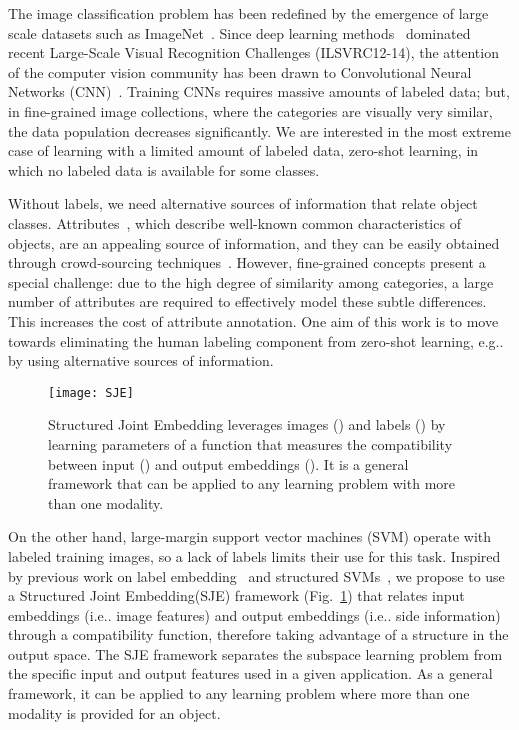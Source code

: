 \documentclass[10pt,twocolumn,letterpaper]{article}
\makeatletter
\newcommand{\cutcaptiondown}{\vspace*{-0.12in}}
\newcommand{\SJElong}{Structured Joint Embedding\xspace}
\newcommand{\SJE}{SJE\xspace}
\DeclareRobustCommand\onedot{\futurelet\@let@token\@onedot}
\def\@onedot{\ifx\@let@token.\else.\null\fi\xspace}
\def\eg{{e.g}\onedot} \def\Eg{{E.g}\onedot}
\def\ie{{i.e}\onedot} \def\Ie{{I.e}\onedot}
\makeatother
\begin{document}
The image classification problem has been redefined by the emergence of large scale datasets such as ImageNet~\cite{DDS09}. 
Since deep learning methods~\cite{KSH12} dominated recent Large-Scale Visual Recognition Challenges (ILSVRC12-14), the attention of the computer vision community has been drawn to Convolutional Neural Networks (CNN)~\cite{LBBH98}.
Training CNNs requires massive amounts of labeled data; but, in fine-grained image collections, where the categories are visually very similar, the data population decreases significantly.
We are interested in the most extreme case of learning with a limited amount of labeled data, zero-shot learning, in which no labeled data is available for some classes.



Without labels, we need alternative sources of information that relate object classes. 
Attributes~\cite{FZ07, FEHF09, LNH13}, which describe well-known common characteristics of objects, are an appealing source of information, and they can be easily obtained through crowd-sourcing techniques~\cite{DKF13, PG11}. However, fine-grained concepts present a special challenge: due to the high degree of similarity among categories, a large number of attributes are required to effectively model these subtle differences.
This increases the cost of attribute annotation. 
One aim of this work is to move towards 
eliminating the human labeling component from zero-shot learning, \eg by using alternative sources of information. 
\begin{figure}[t]
\begin{center}
\texttt{[image: SJE]}
\end{center}
\caption{\SJElong leverages images () and labels () by learning parameters  of a function  that measures the compatibility between input () and output embeddings (). It is a general framework that can be applied to any learning problem with more than one modality.} \vspace{-2mm}
\label{fig:methodology}
\cutcaptiondown
\end{figure}

On the other hand, large-margin support vector machines (SVM) operate with labeled training images, so a lack of labels limits their use for this task.
Inspired by previous work on label embedding~\cite{WBU10, BWG10, APHS13} and structured SVMs~\cite{TJH05,NL11}, we propose to use a \SJElong (\SJE) framework (Fig.~\ref{fig:methodology}) that relates input embeddings (\ie image features) and output embeddings (\ie side information) through a compatibility function, therefore taking advantage of a structure in the output space. The \SJE framework separates the subspace learning problem from the specific input and output features used in a given application. As a general framework, it can be applied to any learning problem where more than one modality is provided for an object. 
\end{document}
